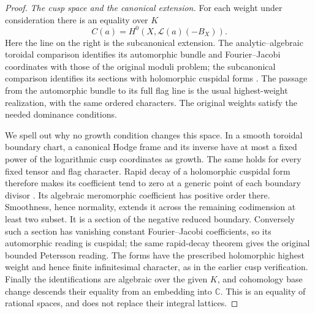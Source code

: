 \begin{proof}
\emph{The cusp space and the canonical extension.}
For each weight under consideration there is an equality over $K$
\begin{equation}\label{eq:actual-section-cusp-extension}
             C(a)=H^0(X,\mathcal L(a)(-B_X)).
\end{equation}
Here the line on the right is the subcanonical extension.  The
analytic--algebraic toroidal comparison identifies its automorphic
bundle and Fourier--Jacobi coordinates with those of the original
moduli problem; the subcanonical comparison identifies its sections
with holomorphic cuspidal forms
\cite{positive-lan-analytic,positive-lan-stroh}.
The passage from the automorphic bundle to its full flag line is the
usual highest-weight realization, with the same ordered characters.
The original weights satisfy the needed dominance conditions.

We spell out why no growth condition changes this space.  In a smooth
toroidal boundary chart, a canonical Hodge frame and its inverse have
at most a fixed power of the logarithmic cusp coordinates as growth.
The same holds for every fixed tensor and flag character.  Rapid decay
of a holomorphic cuspidal form therefore makes its coefficient tend
to zero at a generic point of each boundary divisor
\cite{positive-cusp-decay}.  Its algebraic meromorphic coefficient
has positive order there.  Smoothness, hence normality, extends it
across the remaining codimension at least two subset.  It is a
section of the negative reduced boundary.  Conversely such a section
has vanishing constant Fourier--Jacobi coefficients, so its
automorphic reading is cuspidal; the same rapid-decay theorem gives
the original bounded Petersson reading.  The forms have the
prescribed holomorphic highest weight and hence finite infinitesimal
character, as in the earlier cusp verification.  Finally the
identifications are algebraic over the given $K$, and cohomology
base change descends their equality from an embedding into
$\mathbb C$.  This is an equality of rational spaces, and does not
replace their integral lattices.


\end{proof}

